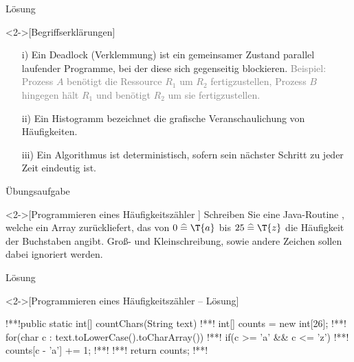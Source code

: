 \begin{frame}[c,fragile]{Lösung}
    \begin{solve}<2->[Begriffserklärungen]
        \begin{enumerate}[<+(1)->]
            \item[i)] Ein Deadlock (Verklemmung) ist ein gemeinsamer Zustand parallel laufender Programme,\pause{} bei der diese sich gegenseitig blockieren.\pause{} \textcolor{gray}{Beispiel:\pause{} Prozess \(A\) benötigt die Ressource \(R_1\) um \(R_2\) fertigzustellen,\pause{} Prozess \(B\) hingegen hält \(R_1\) und benötigt \(R_2\) um sie fertigzustellen.}
            \item[ii)] Ein Histogramm bezeichnet die grafische Veranschaulichung von Häufigkeiten.
            \item[iii)] Ein Algorithmus ist deterministisch, sofern sein nächster Schritt zu jeder Zeit eindeutig ist.
        \end{enumerate}
    \end{solve}
\end{frame}

\begin{frame}[c]{Übungsaufgabe}
    \begin{exercise}<2->[Programmieren eines Häufigkeitszähler ]
        \pause{}Schreiben Sie eine Java-Routine , welche ein Array  zurückliefert,\pause{} das von \(0 \;\widehat{=}\; \T{a}\)\pause{} bis \(25 \;\widehat{=}\; \T{z}\) die Häufigkeit der Buchstaben angibt.\pause{} Groß- und Kleinschreibung, sowie andere Zeichen sollen dabei ignoriert werden.
    \end{exercise}
\end{frame}

\begin{frame}[c,fragile]{Lösung}
    \begin{solve}<2->[Programmieren eines Häufigkeitszähler -- Lösung]
        \begin{plainjava}
!**!public static int[] countChars(String text){
!**!    int[] counts = new int[26];
!**!    for(char c : text.toLowerCase().toCharArray()){
!**!        if(c >= 'a' && c <= 'z')
!**!            counts[c - 'a'] += 1;
!**!    }
!**!    return counts;
!**!}
        \end{plainjava}
    \end{solve}
\end{frame}


